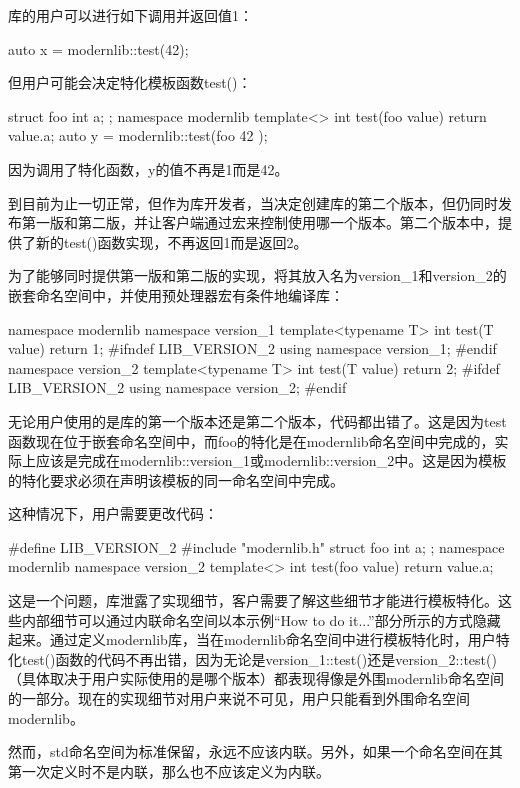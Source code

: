 库的用户可以进行如下调用并返回值1：

\begin{cpp}
auto x = modernlib::test(42);
\end{cpp}

但用户可能会决定特化模板函数test()：

\begin{cpp}
struct foo { int a; };
namespace modernlib
{
    template<>
    int test(foo value) { return value.a; }
}
auto y = modernlib::test(foo{ 42 });
\end{cpp}

因为调用了特化函数，y的值不再是1而是42。

到目前为止一切正常，但作为库开发者，当决定创建库的第二个版本，但仍同时发布第一版和第二版，并让客户端通过宏来控制使用哪一个版本。第二个版本中，提供了新的test()函数实现，不再返回1而是返回2。

为了能够同时提供第一版和第二版的实现，将其放入名为version\_1和version\_2的嵌套命名空间中，并使用预处理器宏有条件地编译库：

\begin{cpp}
namespace modernlib
{
    namespace version_1
    {
        template<typename T>
        int test(T value) { return 1; }
    }
    #ifndef LIB_VERSION_2
    using namespace version_1;
    #endif
    namespace version_2
    {
        template<typename T>
        int test(T value) { return 2; }
    }
    #ifdef LIB_VERSION_2
    using namespace version_2;
    #endif
}
\end{cpp}

无论用户使用的是库的第一个版本还是第二个版本，代码都出错了。这是因为test函数现在位于嵌套命名空间中，而foo的特化是在modernlib命名空间中完成的，实际上应该是完成在modernlib::version\_1或modernlib::version\_2中。这是因为模板的特化要求必须在声明该模板的同一命名空间中完成。

这种情况下，用户需要更改代码：

\begin{cpp}
#define LIB_VERSION_2
#include "modernlib.h"
struct foo { int a; };
namespace modernlib
{
    namespace version_2
    {
        template<>
        int test(foo value) { return value.a; }
    }
}
\end{cpp}

这是一个问题，库泄露了实现细节，客户需要了解这些细节才能进行模板特化。这些内部细节可以通过内联命名空间以本示例“How to do it...”部分所示的方式隐藏起来。通过定义modernlib库，当在modernlib命名空间中进行模板特化时，用户特化test()函数的代码不再出错，因为无论是version\_1::test()还是version\_2::test()（具体取决于用户实际使用的是哪个版本）都表现得像是外围modernlib命名空间的一部分。现在的实现细节对用户来说不可见，用户只能看到外围命名空间modernlib。

然而，std命名空间为标准保留，永远不应该内联。另外，如果一个命名空间在其第一次定义时不是内联，那么也不应该定义为内联。










